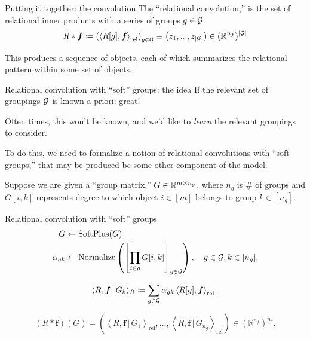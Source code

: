 \documentclass{beamer}
\newcommand{\softreliprod}[3]{\left\langle #1, #2 \, \vert \, #3 \right\rangle_\mathrm{rel}}
\newcommand{\reliprod}[2]{\left\langle #1, #2 \right\rangle_\mathrm{rel}}
\begin{document}
\begin{frame}{Putting it together: the convolution}
  The ``relational convolution,'' is the set of relational inner products with a series of groups $g \in {\mathcal{G}}$,
  \begin{equation*}
    R \ast \bm{f} \coloneq \left( \reliprod{R[g]}{\boldsymbol{f}} \right)_{g \in \calG} \equiv \left(z_1, ..., z_{\abs{\calG}}\right) \in (\mathbb{R}^{n_f})^{\abs{\calG}}
\end{equation*}

This produces a sequence of objects, each of which summarizes the relational pattern within some set of objects.
\end{frame}

\begin{frame}{Relational convolution with ``soft'' groups: the idea}
  If the relevant set of groupings ${\mathcal{G}}$ is known a priori: great!

  Often times, this won't be known, and we'd like to \textit{learn} the relevant groupings to consider.

  To do this, we need to formalize a notion of relational convolutions with ``soft groups,'' that may be produced be some other component of the model.

  Suppose we are given a ``group matrix,'' $G \in \mathbb{R}^{m \times n_g}$, where $n_g$ is \# of groups and $G[i, k]$ represents degree to which object $i \in [m]$ belongs to group $k \in [n_g]$.
\end{frame}

\begin{frame}{Relational convolution with ``soft'' groups}
  \begin{equation*}%
    \begin{split}
        G &\gets \text{SoftPlus}(G)\\
        \alpha_{gk} &\gets \text{Normalize}\paren{\bra{\prod_{i \in g} G[i,k]}_{g \in \calG}}, \quad g \in \calG, k \in [n_g],
    \end{split}
  \end{equation*}

  \begin{equation*}%
    \langle R, \boldsymbol{f} \, \vert \, G_k \rangle_R \coloneqq \sum_{g \in \calG} \alpha_{gk} \iprod{R[g]}{\boldsymbol{f}}_\mathrm{rel}.
  \end{equation*}

  \begin{equation*}%
    (R \ast \bm{f})(G) = \left( \softreliprod{R}{\bm{f}}{G_1}, \ldots, \softreliprod{R}{\bm{f}}{G_{n_g}} \right) \in \left(\mathbb{R}^{n_f}\right)^{n_g}.
  \end{equation*}
\end{frame}
\end{document}
